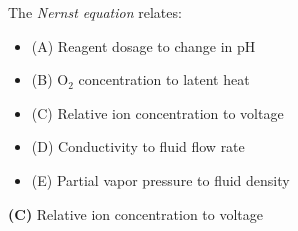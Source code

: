 

The {\it Nernst equation} relates:

\begin{itemize}
\item{(A)} Reagent dosage to change in pH
\vskip 5pt 
\item{(B)} O$_{2}$ concentration to latent heat
\vskip 5pt 
\item{(C)} Relative ion concentration to voltage
\vskip 5pt 
\item{(D)} Conductivity to fluid flow rate
\vskip 5pt 
\item{(E)} Partial vapor pressure to fluid density
\end{itemize}







{\bf (C)} Relative ion concentration to voltage 
 









